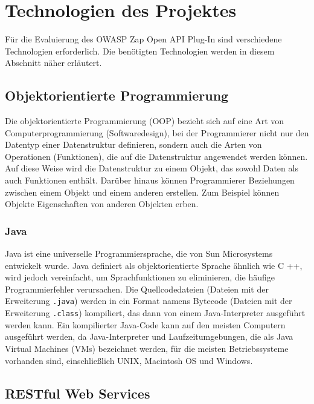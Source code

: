 \section{Technologien des Projektes}

Für die Evaluierung des OWASP Zap Open API Plug-In sind verschiedene Technologien erforderlich. Die benötigten Technologien werden in diesem Abschnitt näher erläutert.

\subsection{Objektorientierte Programmierung}

Die objektorientierte Programmierung (OOP) bezieht sich auf eine Art von Computerprogrammierung (Softwaredesign), bei der Programmierer nicht nur den Datentyp einer Datenstruktur definieren, sondern auch die Arten von Operationen (Funktionen), die auf die Datenstruktur angewendet werden können. Auf diese Weise wird die Datenstruktur zu einem Objekt, das sowohl Daten als auch Funktionen enthält. Darüber hinaus können Programmierer Beziehungen zwischen einem Objekt und einem anderen erstellen. Zum Beispiel können Objekte Eigenschaften von anderen Objekten erben\cite{oop15beal}.

\subsubsection{Java}

Java ist eine universelle Programmiersprache, die von Sun Microsystems entwickelt wurde. Java definiert als objektorientierte Sprache ähnlich wie C ++, wird jedoch vereinfacht, um Sprachfunktionen zu eliminieren, die häufige Programmierfehler verursachen. Die Quellcodedateien (Dateien mit der Erweiterung \texttt{.java}) werden in ein Format namens Bytecode (Dateien mit der Erweiterung \texttt{.class}) kompiliert, das dann von einem Java-Interpreter ausgeführt werden kann. Ein kompilierter Java-Code kann auf den meisten Computern ausgeführt werden, da Java-Interpreter und Laufzeitumgebungen, die als Java Virtual Machines (VMs) bezeichnet werden, für die meisten Betriebssysteme vorhanden sind, einschließlich UNIX, Macintosh OS und Windows\cite{java18beal}.

\subsection{RESTful Web Services}

